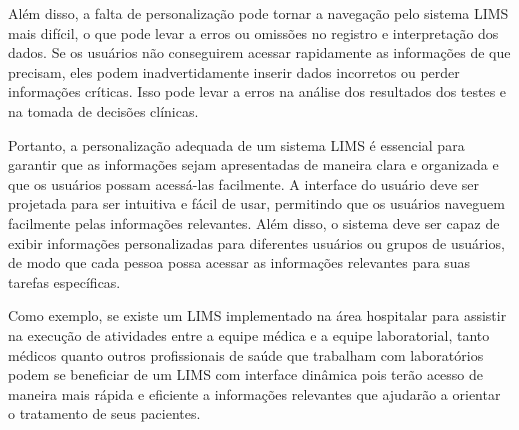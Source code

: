 Além disso, a falta de personalização pode tornar a navegação pelo sistema LIMS mais difícil, o que pode levar a erros ou omissões no registro e interpretação dos dados. Se os usuários não conseguirem acessar rapidamente as informações de que precisam, eles podem inadvertidamente inserir dados incorretos ou perder informações críticas. Isso pode levar a erros na análise dos resultados dos testes e na tomada de decisões clínicas.

Portanto, a personalização adequada de um sistema LIMS é essencial para garantir que as informações sejam apresentadas de maneira clara e organizada e que os usuários possam acessá-las facilmente. A interface do usuário deve ser projetada para ser intuitiva e fácil de usar, permitindo que os usuários naveguem facilmente pelas informações relevantes. Além disso, o sistema deve ser capaz de exibir informações personalizadas para diferentes usuários ou grupos de usuários, de modo que cada pessoa possa acessar as informações relevantes para suas tarefas específicas.


Como exemplo, se existe um LIMS implementado na área hospitalar para assistir na execução de atividades entre a equipe médica e a equipe laboratorial, tanto médicos quanto outros profissionais de saúde que trabalham com laboratórios podem se beneficiar de um LIMS com interface dinâmica pois terão acesso de maneira mais rápida e eficiente a informações relevantes que ajudarão a orientar o tratamento de seus pacientes.
